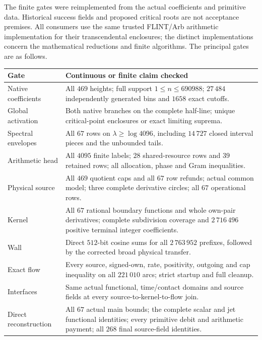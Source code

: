 \documentclass[11pt,a4paper]{article}
\theoremstyle{definition}
\theoremstyle{remark}
\begin{document}
The finite gates were reimplemented from the actual coefficients and
primitive data. Historical success fields and proposed critical roots
are not acceptance premises. All consumers use the same trusted
FLINT/Arb arithmetic implementation for their transcendental enclosures;
the distinct implementations concern the mathematical reductions and
finite algorithms. The principal gates are as follows.
\begin{center}\small
\begin{tabularx}{\textwidth}{@{}p{}X@{}}\toprule
Gate & Continuous or finite claim checked\\\midrule
Native coefficients & All $469$ heights; full support $1\leq n\leq690988$;
$27\,484$ independently generated bins and $1658$ exact cutoffs.\\
Global activation & Both native branches on the complete half-line;
unique critical-point enclosures or exact limiting suprema.\\
Spectral envelopes & All $67$ rows on $\lambda\geq\log4096$, including
$14\,727$ closed interval pieces and the unbounded tails.\\
Arithmetic head & All $4095$ finite labels; $28$ shared-resource rows
and $39$ retained rows; all allocation, phase and Gram inequalities.\\
Physical source & All $469$ quotient caps and all $67$ row refunds; actual common
model; three complete derivative circles; all $67$ operational rows.\\
Kernel & All $67$ rational boundary functions and whole own-pair
derivatives; complete subdivision coverage and $2\,716\,496$
positive terminal integer coefficients.\\
Wall & Direct $512$-bit cosine sums for all $2\,763\,952$ prefixes,
followed by the corrected broad physical transfer.\\
Exact flow & Every source, signed-own, rate, positivity, outgoing and
cap inequality on all $221\,010$ arcs; strict startup and full cleanup.\\
Interfaces & Same actual functional, time/contact domains and source
fields at every source-to-kernel-to-flow join.\\
Direct reconstruction & All $67$ actual main bounds; the complete scalar and jet functional identities; every primitive debit and arithmetic payment; all $268$ final source-field identities.\\\bottomrule
\end{tabularx}
\end{center}
\end{document}

